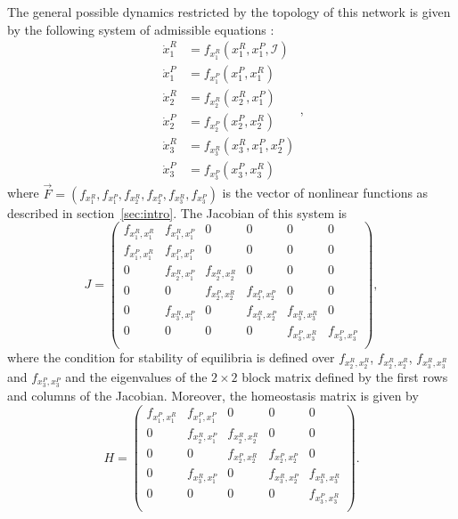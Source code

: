 The general possible dynamics restricted by
the topology of this network is given by the following system of 
admissible equations \cite{martin_ian_groupoids2006}:
\begin{equation} \label{eq:broken_n1_1}
    \begin{aligned}
        \dot{x}_1^R &= f_{x_1^R}(x_1^R, x_1^P, \mathcal{I})\\
        \dot{x}_1^P &= f_{x_1^P}(x_1^P, x_1^R)\\
        \dot{x}_2^R &= f_{x_2^R}(x_2^R, x_1^P)\\
        \dot{x}_2^P &= f_{x_2^P}(x_2^P, x_2^R)\\
        \dot{x}_3^R &= f_{x_3^R}(x_3^R, x_1^P, x_2^P)\\
        \dot{x}_3^P &= f_{x_3^P}(x_3^P, x_3^R)
    \end{aligned},
\end{equation}
where $\vec{F} = (f_{x_1^R}, f_{x_1^P}, f_{x_2^R}, f_{x_2^P}, 
f_{x_3^R}, f_{x_3^P})$ is 
the vector of nonlinear functions as described in 
section~\ref{sec:intro}. The Jacobian of this system is 
\begin{equation}
    J = 
    \begin{pmatrix}
        f_{x_1^R,x_1^R} & f_{x_1^R, x_1^P} & 0 & 0 & 0 & 0 \\
        f_{x_1^P,x_1^R} & f_{x_1^P,x_1^P} & 0 & 0 & 0 & 0 \\
        0 & f_{x_2^R,x_1^P} & f_{x_2^R,x_2^R} & 0 & 0 & 0 \\
        0 & 0 & f_{x_2^P,x_2^R} & f_{x_2^P,x_2^P} & 0 & 0 \\
        0 & f_{x_3^R,x_1^P} & 0 & f_{x_3^R,x_2^P} & f_{x_3^R,x_3^R} & 0 \\
        0 & 0 & 0 & 0 & f_{x_3^P,x_3^R} & f_{x_3^P,x_3^P} \\
    \end{pmatrix},
\end{equation} 
where the condition for stability of equilibria is defined over 
$f_{x_2^R,x_2^R}$, $f_{x_2^R,x_2^R}$, $f_{x_3^R,x_3^R}$ and 
$f_{x_3^P,x_3^P}$ and the eigenvalues of the $2 \times 2$ 
block matrix defined by the first rows and columns of the Jacobian. 
Moreover, the homeostasis matrix is given by
\begin{equation}
    H = 
    \begin{pmatrix}
        f_{x_1^P,x_1^R} & f_{x_1^P,x_1^P} & 0 & 0 & 0\\
        0 & f_{x_2^R,x_1^P} & f_{x_2^R,x_2^R} & 0 & 0\\
        0 & 0 & f_{x_2^P,x_2^R} & f_{x_2^P,x_2^P} & 0\\
        0 & f_{x_3^R,x_1^P} & 0 & f_{x_3^R,x_2^P} & f_{x_3^R,x_3^R}\\
        0 & 0 & 0 & 0 & f_{x_3^P,x_3^R} \\
    \end{pmatrix}.
\end{equation} 

